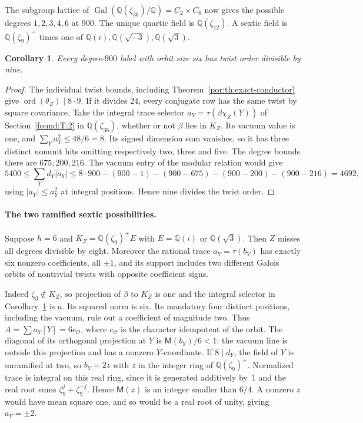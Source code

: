 \documentclass[11pt,a4paper]{article}
\numberwithin{equation}{section}
\newtheorem{corollary}[theorem]{Corollary}
\theoremstyle{remark}
\newcommand{\QQ}{\mathbb Q}
\begin{document}
The subgroup lattice of $\operatorname{Gal}(\QQ(\zeta_{36})/\QQ)=C_2\times C_6$ now gives the possible degrees $1,2,3,4,6$ at $900$. The unique quartic field is $\QQ(\zeta_{12})$. A sextic field is $\QQ(\zeta_9)^+$ times one of $\QQ(i),\QQ(\sqrt{-3}),\QQ(\sqrt3)$.

\begin{corollary}\label{por:cor:six-needs-nine}
Every degree-$900$ label with orbit size six has twist order divisible by nine.
\end{corollary}
\begin{proof}
The individual twist bounds, including Theorem~\ref{por:th:exact-conductor} give $\operatorname{ord}(\theta_Z)\mid8\cdot9$. If it divides $24$, every conjugate row has the same twist by square covariance. Take the integral trace selector $a_Y=\tau(\beta\chi_Z(Y))$ of Section~\ref{found:T:2} in $\mathbb Q(\zeta_{36})$, whether or not $\beta$ lies in $K_Z$. Its vacuum value is one, and $\sum_Ya_Y^2\le48/6=8$. Its signed dimension sum vanishes, so it has three distinct nonunit hits omitting respectively two, three and five. The degree bounds there are $675,200,216$. The vacuum entry of the modular relation would give
\[
 5400\le\sum_Y d_Y|a_Y|
 \le 8\cdot900-(900-1)-(900-675)-(900-200)-(900-216)=4692,
\]
using $|a_Y|\le a_Y^2$ at integral positions. Hence nine divides the twist order.
\end{proof}

\paragraph{The two ramified sextic possibilities.}
Suppose $h=6$ and $K_Z=\mathbb Q(\zeta_9)^+E$ with $E=\mathbb Q(i)$ or $\mathbb Q(\sqrt3)$. Then $Z$ misses all degrees divisible by eight. Moreover the rational trace $a_Y=\tau(b_Y)$ has exactly six nonzero coefficients, all $\pm1$, and its support includes two different Galois orbits of nontrivial twists with opposite coefficient signs.

Indeed $\zeta_3\notin K_Z$, so projection of $\beta$ to $K_Z$ is one and the integral selector in Corollary~\ref{por:cor:six-needs-nine} is $a$. Its squared norm is six. Its mandatory four distinct positions, including the vacuum, rule out a coefficient of magnitude two. Thus $A=\sum a_Y[Y]=6e_{\mathcal O}$, where $e_{\mathcal O}$ is the character idempotent of the orbit. The diagonal of its orthogonal projection at $Y$ is $\mathsf M(b_Y)/6<1$: the vacuum line is outside this projection and has a nonzero $Y$-coordinate. If $8\mid d_Y$, the field of $Y$ is unramified at two, so $b_Y=2z$ with $z$ in the integer ring of $\mathbb Q(\zeta_9)^+$. Normalized trace is integral on this real ring, since it is generated additively by~$1$ and the real root sums $\zeta_9^j+\zeta_9^{-j}$. Hence $\mathsf M(z)$ is an integer smaller than $6/4$. A nonzero $z$ would have mean square one, and so would be a real root of unity, giving $a_Y=\pm2$.
\end{document}

